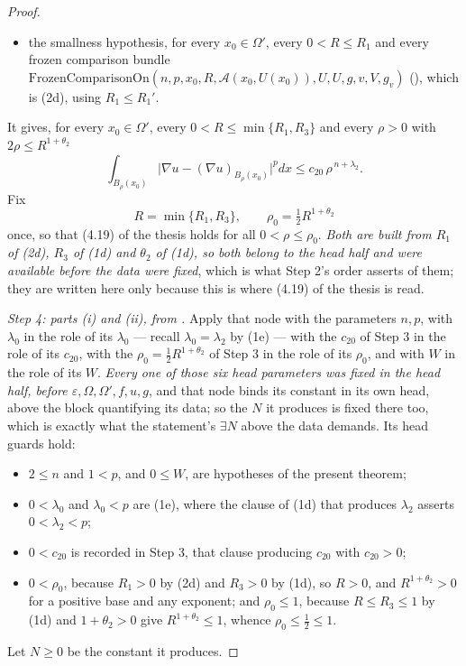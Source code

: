 \begin{proof}
\begin{itemize}
  $R_1\le d/16$; and
\item the smallness hypothesis, for every $x_0\in\Omega'$, every
  $0<R\le R_1$ and every frozen comparison bundle
  $\mathrm{FrozenComparisonOn}(n,p,x_0,R,\mathcal A(x_0,U(x_0)),U,U,g,v,V,g_v)$
  (), which is (2d), using $R_1\le R_1'$.
\end{itemize}
It gives, for every
$x_0\in\Omega'$, every $0<R\le\min\{R_1,R_3\}$ and every $\rho>0$ with
$2\rho\le R^{1+\theta_2}$
\[
\int_{B_\rho(x_0)}\bigl|\nabla u-(\nabla u)_{B_\rho(x_0)}\bigr|^pdx
\le c_{20}\,\rho^{\,n+\lambda_2}.
\tag{4.19}
\]
Fix
\[
R=\min\{R_1,R_3\},\qquad \rho_0=\tfrac12R^{1+\theta_2}
\]
once, so that (4.19) of the thesis holds for all $0<\rho\le\rho_0$.  \emph{Both are
built from $R_1$ of \textup{(2d)}, $R_3$ of \textup{(1d)} and $\theta_2$ of
\textup{(1d)}, so both belong to the head half and were available before the
data were fixed}, which is what Step 2's order asserts of them; they are written
here only because this is where (4.19) of the thesis is read.

\emph{Step 4: parts \textup{(i)} and \textup{(ii)}, from
.}  Apply that node with the parameters $n,p$,
with $\lambda_0$ in the role of its $\lambda_0$ --- recall $\lambda_0=\lambda_2$
by (1e) --- with the $c_{20}$ of Step 3 in the role of its $c_{20}$, with the
$\rho_0=\tfrac12R^{1+\theta_2}$ of Step 3 in the role of its $\rho_0$, and with
$W$ in the role of its $W$.  \emph{Every one of those six head parameters was
fixed in the head half, before $\varepsilon,\Omega,\Omega',f,u,g$}, and that
node binds its constant in its own head, above the block quantifying its data;
so the $N$ it produces is fixed there too, which is exactly what the statement's
$\exists N$ above the data demands.  Its head guards hold:
\begin{itemize}
\item $2\le n$ and $1<p$, and $0\le W$, are hypotheses of the present theorem;
\item $0<\lambda_0$ and $\lambda_0<p$ are (1e), where the clause of (1d) that
  produces $\lambda_2$ asserts $0<\lambda_2<p$;
\item $0<c_{20}$ is recorded in Step 3, that clause producing $c_{20}$ with
  $c_{20}>0$;
\item $0<\rho_0$, because $R_1>0$ by (2d) and $R_3>0$ by (1d), so $R>0$, and
  $R^{1+\theta_2}>0$ for a positive base and any exponent; and $\rho_0\le1$,
  because $R\le R_3\le1$ by (1d) and $1+\theta_2>0$ give $R^{1+\theta_2}\le1$,
  whence $\rho_0\le\tfrac12\le1$.
\end{itemize}
Let $N\ge0$ be the constant it produces.


\end{proof}
